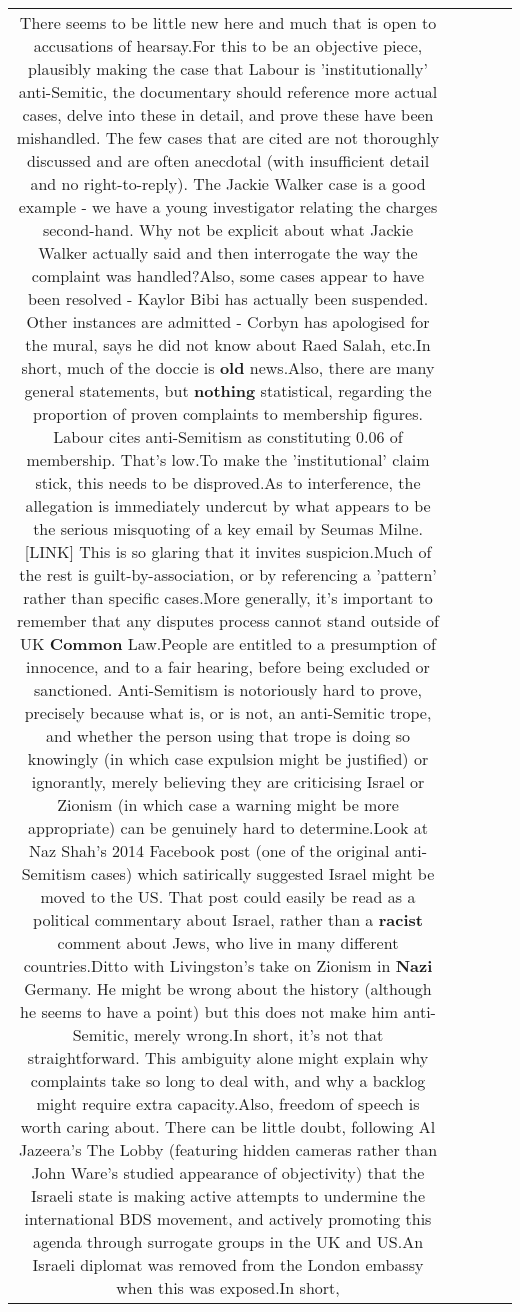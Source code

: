 \documentclass[11pt]{article}
\newlength\mylength
\begin{document}
\begin{center}
\begin{longtable}{|C{.65\mylength}|C{.30\mylength}|C{.12\mylength}|C{.12\mylength}|C{.12\mylength}|}
  \small There seems to be little new here and much that is open to accusations of hearsay.For this to be an objective piece, plausibly making the case that Labour is 'institutionally' anti-Semitic, the documentary should reference more actual cases, delve into these in detail, and prove these have been mishandled. The few cases that are cited are not thoroughly discussed and are often anecdotal (with insufficient detail and no right-to-reply). The Jackie Walker case is a good example - we have a young investigator relating the charges second-hand. Why not be explicit about what Jackie Walker actually said and then interrogate the way the complaint was handled?Also, some cases appear to have been resolved - Kaylor Bibi has actually been suspended. Other instances are admitted - Corbyn has apologised for the mural, says he did not know about Raed Salah, etc.In short, much of the doccie is \textbf{old} news.Also, there are many general statements, but \textbf{nothing} statistical, regarding the proportion of proven complaints to membership figures. Labour cites anti-Semitism as constituting 0.06 of membership. That's low.To make the 'institutional' claim stick, this needs to be disproved.As to interference, the allegation is immediately undercut by what appears to be the serious misquoting of a key email by Seumas Milne.  [LINK] This is so glaring that it invites suspicion.Much of the rest is guilt-by-association, or by referencing a 'pattern' rather than specific cases.More generally, it's important to remember that any disputes process cannot stand outside of UK \textbf{Common} Law.People are entitled to a presumption of innocence, and to a fair hearing, before being excluded or sanctioned. Anti-Semitism is notoriously hard to prove, precisely because what is, or is not, an anti-Semitic trope, and whether the person using that trope is doing so knowingly (in which case expulsion might be justified) or ignorantly, merely believing they are criticising Israel or Zionism (in which case a warning might be more appropriate) can be genuinely hard to determine.Look at Naz Shah's 2014 Facebook post (one of the original anti-Semitism cases) which satirically suggested Israel might be moved to the US. That post could easily be read as a political commentary about Israel, rather than a \textbf{racist} comment about Jews, who live in many different countries.Ditto with Livingston's take on Zionism in \textbf{Nazi} Germany. He might be wrong about the history (although he seems to have a point) but this does not make him anti-Semitic, merely wrong.In short, it's not that straightforward. This ambiguity alone might explain why complaints take so long to deal with, and why a backlog might require extra capacity.Also, freedom of speech is worth caring about. There can be little doubt, following Al Jazeera's The Lobby (featuring hidden cameras rather than John Ware's studied appearance of objectivity) that the Israeli state is making active attempts to undermine the international BDS movement, and actively promoting this agenda through surrogate groups in the UK and US.An Israeli diplomat was removed from the London embassy when this was exposed.In short, 
\end{longtable}
\end{center}
\end{document}
